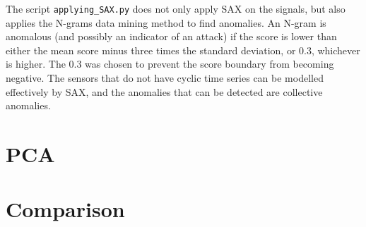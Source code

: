 \documentclass[]{article}
\begin{document}
The script \texttt{applying\_SAX.py} does not only apply SAX on the signals, but also applies the N-grams data mining method to find anomalies. An N-gram is anomalous (and possibly an indicator of an attack) if the score is lower than either the mean score minus three times the standard deviation, or 0.3, whichever is higher. The 0.3 was chosen to prevent the score boundary from becoming negative. The sensors that do not have cyclic time series can be modelled effectively by SAX, and the anomalies that can be detected are collective anomalies.
\clearpage
\section{PCA}
\section{Comparison} 
\end{document}

